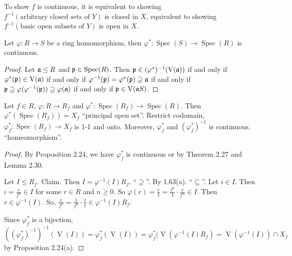 \begin{fact}
    To show $f$ is continuous, it is equivalent to showing $f^{-1}(\text{arbitrary closed sets of $Y$})$ is closed in $X$, equivalent to showing $f^{-1}(\text{basic open subsets of $Y$})$ is open in $X$.
\end{fact}

\begin{theorem}
    Let $\varphi: R \to S$ be a ring homomorphism, then $\varphi^*: \operatorname{Spec}(S) \to \operatorname{Spec}(R)$ is continuous. 
\end{theorem}

\begin{proof}
    Let $\mathfrak{a} \leq R$ and $\mathfrak{p} \in \operatorname{Spec}(R)$. Then $\mathfrak{p} \in (\varphi^*)^{-1}(\operatorname{V}(\mathfrak{a}))$ if and only if $\varphi^*(\mathfrak{p}) \in \operatorname{V}(\mathfrak{a})$ if and only if $\varphi^{-1}(\mathfrak{p}) = \varphi^*(\mathfrak{p}) \supseteq \mathfrak{a}$ if and only if $\mathfrak{p} \supseteq \varphi(\varphi^{-1}(\mathfrak{p})) \supseteq \varphi(\mathfrak{a})$ if and only if $\mathfrak{p} \in \operatorname{V}(\mathfrak{a} S)$.
\end{proof}

\begin{theorem}
    Let $f \in R$, $\varphi: R \to R_f$ and $\varphi^*: \operatorname{Spec}(R_f) \to \operatorname{Spec}(R)$. Then  $\varphi^*(\operatorname{Spec}(R_f)) = X_f$ ``principal open set''. Restrict codomain, $\varphi_f^*: \operatorname{Spec}(R_f) \to X_f$ is 1-1 and onto. Moreover, $\varphi_f^*$ and $(\varphi_f^*)^{-1}$ is continuous. ``homeomorphism''. 
\end{theorem}

\begin{proof}
    By Proposition 2.24, we have $\varphi_f^*$ is continuous or by Theorem 2.27 and Lemma 2.30. \par 
    Let $I \leq R_f$. Claim. Then $I = \varphi^{-1}(I)R_f$. ``$\supseteq$''. By 1.63(a). ``$\subseteq$''. Let $i \in I$. Then $i = \frac{r}{f^n} \in I$ for some $r \in R$ and $n \geq 0$. So $\varphi(r) = \frac{r}{1} = \frac{f^n}{1} \cdot \frac{r}{f^n} \in I $. Then $r \in \varphi^{-1}(I)$. So, $\frac{r}{f^n} = \frac{1}{f^n} \cdot \frac{r}{1} \in \varphi^{-1}(I) R_f$. \par 
    Since $\varphi_f^*$ is a bijection, $((\varphi_f^*)^{-1})^{-1}(\operatorname{V}(I)) = \varphi_f^*(\operatorname{V}(I)) = \varphi_f^*(\operatorname{V}(\varphi^{-1}(I)R_f) = \operatorname{V}(\varphi^{-1}(I)) \cap X_f$ by Proposition 2.24(a). 
\end{proof}

